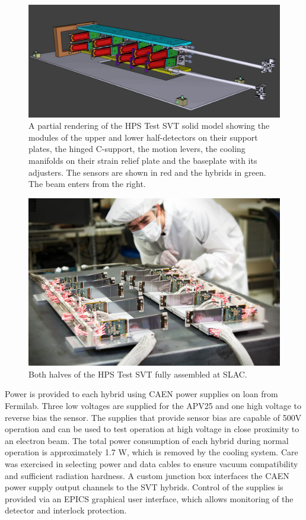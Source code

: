 \begin{figure}[ht]
    \includegraphics[width=\textwidth]{test2012/HPS_nocables_nowires}
\caption{\small{A partial rendering of the HPS Test SVT solid model showing the modules of the upper and lower half-detectors on their support plates, the hinged C-support, the motion levers, the cooling manifolds on their strain relief plate and the baseplate with its adjusters.  The sensors are shown in red and the hybrids in green. The beam enters from the right.} }
\label{fig:tracker_model}
\end{figure}

\begin{figure}[ht]
    \includegraphics[width=\textwidth]{test2012/2012-101-PHOTON-DETECTOR-001.jpg}
\caption{\small{Both halves of the HPS Test SVT fully assembled at SLAC.} }
\label{fig:tracker_halves}
\end{figure}

Power is provided to each hybrid using CAEN power supplies on loan from Fermilab. Three low voltages are supplied for the APV25 and one high voltage to reverse bias the sensor. The supplies that provide sensor bias are capable of 500V operation and can be used to test operation at high voltage in close proximity to an electron beam. The total power consumption of each hybrid during normal operation is approximately 1.7 W, which is removed by the cooling system. Care was exercised in selecting power and data cables to ensure vacuum compatibility and sufficient radiation hardness. A custom junction box interfaces the CAEN power supply output channels to the SVT hybrids. Control of the supplies is provided via an EPICS graphical user interface, which allows monitoring of the detector and interlock protection.

